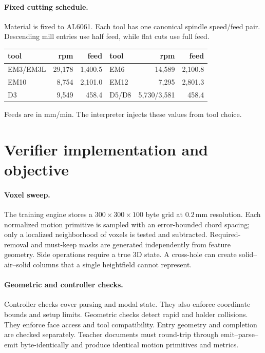 \documentclass{article}
\begin{document}
\paragraph{Fixed cutting schedule.}
Material is fixed to AL6061.  Each tool has one canonical spindle
speed/feed pair.  Descending mill entries use half feed, while flat
cuts use full feed.
\begin{center}
\begin{tabular}{lrr@{\qquad}lrr}
\toprule
tool & rpm & feed & tool & rpm & feed\\
\midrule
EM3/EM3L & 29,178 & 1,400.5 & EM6 & 14,589 & 2,100.8\\
EM10 & 8,754 & 2,101.0 & EM12 & 7,295 & 2,801.3\\
D3 & 9,549 & 458.4 & D5/D8 & 5,730/3,581 & 458.4\\
\bottomrule
\end{tabular}
\end{center}
Feeds are in mm/min.  The interpreter injects these values from tool
choice.

\section{Verifier implementation and objective}
\label{app:verifier}

\paragraph{Voxel sweep.}
The training engine stores a $300\times300\times100$ byte grid at
$0.2$\,mm resolution.  Each normalized motion primitive is sampled with
an error-bounded chord spacing; only a localized neighborhood of voxels is
tested and subtracted.  Required-removal and must-keep masks are generated
independently from feature geometry.  Side operations require a true 3D
state.  A cross-hole can create solid--air--solid columns that a single
heightfield cannot represent.

\paragraph{Geometric and controller checks.}
Controller checks cover parsing and modal state.  They also enforce
coordinate bounds and setup limits.  Geometric checks detect rapid and
holder collisions.  They enforce face access and tool compatibility.
Entry geometry and completion are checked separately.  Teacher documents must
round-trip through emit--parse--emit byte-identically and produce identical
motion primitives and metrics.
\end{document}
